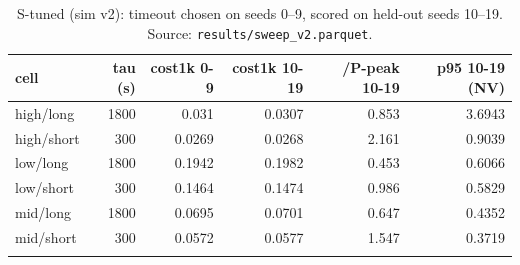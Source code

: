 \begin{table}[htbp]
\centering
\footnotesize
\caption{S-tuned (sim v2): timeout chosen on seeds 0--9, scored on held-out seeds 10--19. Source: \texttt{results/sweep\_v2.parquet}.}
\label{tab:heldout}
\setlength{\tabcolsep}{3pt}
\begin{tabular}{lrrrrr}
\toprule
\textbf{cell} & \textbf{tau (s)} & \textbf{cost1k 0-9} & \textbf{cost1k 10-19} & \textbf{/P-peak 10-19} & \textbf{p95 10-19 (NV)} \\
\midrule
high/long & 1800 & 0.031 & 0.0307 & 0.853 & 3.6943 \\
high/short & 300 & 0.0269 & 0.0268 & 2.161 & 0.9039 \\
low/long & 1800 & 0.1942 & 0.1982 & 0.453 & 0.6066 \\
low/short & 300 & 0.1464 & 0.1474 & 0.986 & 0.5829 \\
mid/long & 1800 & 0.0695 & 0.0701 & 0.647 & 0.4352 \\
mid/short & 300 & 0.0572 & 0.0577 & 1.547 & 0.3719 \\
\botrule
\end{tabular}
\end{table}
